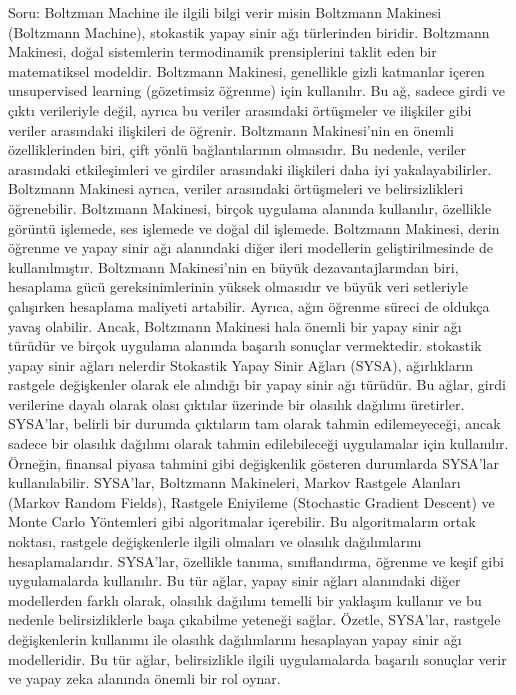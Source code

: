 \documentclass[11pt]{article}
\begin{document}
Soru: Boltzman Machine ile ilgili bilgi verir misin
Boltzmann Makinesi (Boltzmann Machine), stokastik yapay sinir ağı türlerinden biridir. Boltzmann Makinesi, doğal sistemlerin termodinamik prensiplerini taklit eden bir matematiksel modeldir.
Boltzmann Makinesi, genellikle gizli katmanlar içeren unsupervised learning (gözetimsiz öğrenme) için kullanılır. Bu ağ, sadece girdi ve çıktı verileriyle değil, ayrıca bu veriler arasındaki örtüşmeler ve ilişkiler gibi veriler arasındaki ilişkileri de öğrenir.
Boltzmann Makinesi'nin en önemli özelliklerinden biri, çift yönlü bağlantılarının olmasıdır. Bu nedenle, veriler arasındaki etkileşimleri ve girdiler arasındaki ilişkileri daha iyi yakalayabilirler. Boltzmann Makinesi ayrıca, veriler arasındaki örtüşmeleri ve belirsizlikleri öğrenebilir.
Boltzmann Makinesi, birçok uygulama alanında kullanılır, özellikle görüntü işlemede, ses işlemede ve doğal dil işlemede. Boltzmann Makinesi, derin öğrenme ve yapay sinir ağı alanındaki diğer ileri modellerin geliştirilmesinde de kullanılmıştır.
Boltzmann Makinesi'nin en büyük dezavantajlarından biri, hesaplama gücü gereksinimlerinin yüksek olmasıdır ve büyük veri setleriyle çalışırken hesaplama maliyeti artabilir. Ayrıca, ağın öğrenme süreci de oldukça yavaş olabilir. Ancak, Boltzmann Makinesi hala önemli bir yapay sinir ağı türüdür ve birçok uygulama alanında başarılı sonuçlar vermektedir.
stokastik yapay sinir ağları nelerdir
Stokastik Yapay Sinir Ağları (SYSA), ağırlıkların rastgele değişkenler olarak ele alındığı bir yapay sinir ağı türüdür. Bu ağlar, girdi verilerine dayalı olarak olası çıktılar üzerinde bir olasılık dağılımı üretirler.
SYSA'lar, belirli bir durumda çıktıların tam olarak tahmin edilemeyeceği, ancak sadece bir olasılık dağılımı olarak tahmin edilebileceği uygulamalar için kullanılır. Örneğin, finansal piyasa tahmini gibi değişkenlik gösteren durumlarda SYSA'lar kullanılabilir.
SYSA'lar, Boltzmann Makineleri, Markov Rastgele Alanları (Markov Random Fields), Rastgele Eniyileme (Stochastic Gradient Descent) ve Monte Carlo Yöntemleri gibi algoritmalar içerebilir. Bu algoritmaların ortak noktası, rastgele değişkenlerle ilgili olmaları ve olasılık dağılımlarını hesaplamalarıdır.
SYSA'lar, özellikle tanıma, sınıflandırma, öğrenme ve keşif gibi uygulamalarda kullanılır. Bu tür ağlar, yapay sinir ağları alanındaki diğer modellerden farklı olarak, olasılık dağılımı temelli bir yaklaşım kullanır ve bu nedenle belirsizliklerle başa çıkabilme yeteneği sağlar.
Özetle, SYSA'lar, rastgele değişkenlerin kullanımı ile olasılık dağılımlarını hesaplayan yapay sinir ağı modelleridir. Bu tür ağlar, belirsizlikle ilgili uygulamalarda başarılı sonuçlar verir ve yapay zeka alanında önemli bir rol oynar.
\end{document}
